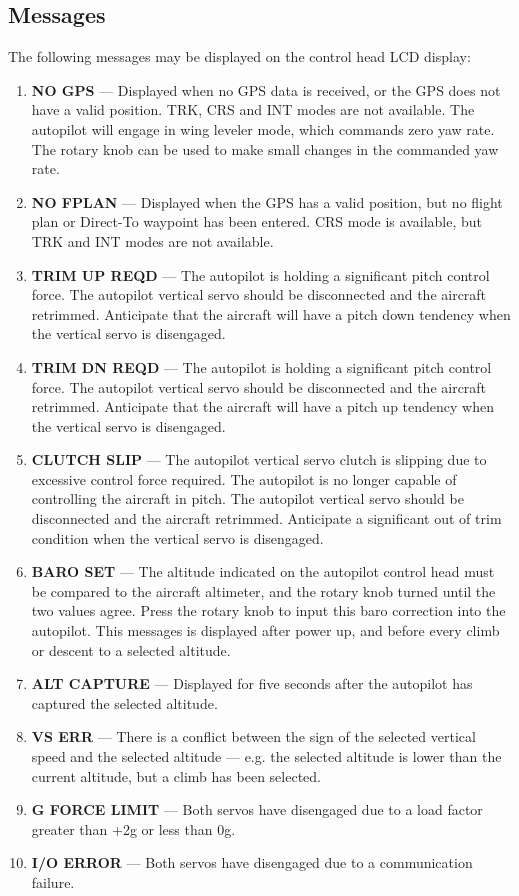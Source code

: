 \subsection*{Messages}
The following messages may be displayed on the control head LCD display:
\begin{enumerate}
\item \textbf{NO GPS} --- Displayed when no GPS data is received, or the GPS does not have a valid position. TRK, CRS and INT modes are not available. The autopilot will engage in wing leveler mode, which commands zero yaw rate. The rotary knob can be used to make small changes in the commanded yaw rate.
\item \textbf{NO FPLAN} --- Displayed when the GPS has a valid position, but no flight plan or Direct-To waypoint has been entered. CRS mode is available, but TRK and INT modes are not available.
\item \textbf{TRIM UP REQD} --- The autopilot is holding a significant pitch control force. The autopilot vertical servo should be disconnected and the aircraft retrimmed. Anticipate that the aircraft will have a pitch down tendency when the vertical servo is disengaged.
\item \textbf{TRIM DN REQD} --- The autopilot is holding a significant pitch control force. The autopilot vertical servo should be disconnected and the aircraft retrimmed. Anticipate that the aircraft will have a pitch up tendency when the vertical servo is disengaged.
\item \textbf{CLUTCH SLIP} --- The autopilot vertical servo clutch is slipping due to excessive control force required. The autopilot is no longer capable of controlling the aircraft in pitch. The autopilot vertical servo should be disconnected and the aircraft retrimmed. Anticipate a significant out of trim condition when the vertical servo is disengaged.
\item \textbf{BARO SET} --- The altitude indicated on the autopilot control head must be compared to the aircraft altimeter, and the rotary knob turned until the two values agree. Press the rotary knob to input this baro correction into the autopilot. This messages is displayed after power up, and before every climb or descent to a selected altitude.
\item \textbf{ALT CAPTURE} --- Displayed for five seconds after the autopilot has captured the selected altitude.
\item \textbf{VS ERR} --- There is a conflict between the sign of the selected vertical speed and the selected altitude --- e.g. the selected altitude is lower than the current altitude, but a climb has been selected.
\item \textbf{G FORCE LIMIT} --- Both servos have disengaged due to a load factor greater than +2g or less than 0g.
\item \textbf{I/O ERROR} --- Both servos have disengaged due to a communication failure.
\end{enumerate}
